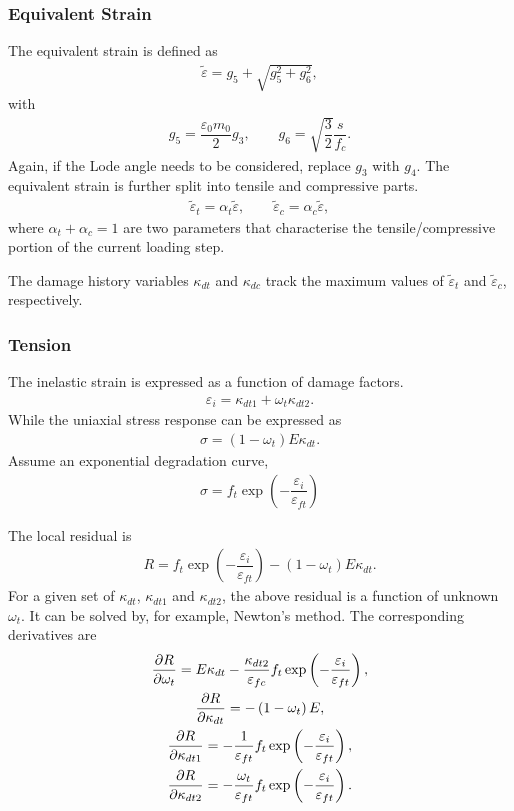 \subsubsection{Equivalent Strain}
The equivalent strain is defined as
\begin{gather}
\tilde{\varepsilon}=g_5+\sqrt{g_5^2+g_6^2},
\end{gather}
with
\begin{gather}
g_5=\dfrac{\varepsilon_0m_0}{2}g_3,\qquad
g_6=\sqrt{\dfrac{3}{2}}\dfrac{s}{f_c}.
\end{gather}
Again, if the Lode angle needs to be considered, replace $g_3$ with $g_4$. The equivalent strain is further split into tensile and compressive parts.
\begin{gather}
\tilde{\varepsilon}_t=\alpha_t\tilde{\varepsilon},\qquad
\tilde{\varepsilon}_c=\alpha_c\tilde{\varepsilon},
\end{gather}
where $\alpha_t+\alpha_c=1$ are two parameters that characterise the tensile/compressive portion of the current loading step.

The damage history variables $\kappa_{dt}$ and $\kappa_{dc}$ track the maximum values of $\tilde{\varepsilon}_t$ and $\tilde{\varepsilon}_c$, respectively.
\subsubsection{Tension}
The inelastic strain is expressed as a function of damage factors.
\begin{gather}
\varepsilon_i=\kappa_{dt1}+\omega_t\kappa_{dt2}.
\end{gather}
While the uniaxial stress response can be expressed as
\begin{gather}
\sigma=\left(1-\omega_t\right)E\kappa_{dt}.
\end{gather}
Assume an exponential degradation curve,
\begin{gather}
\sigma=f_t\exp\left(-\dfrac{\varepsilon_i}{\varepsilon_{ft}}\right)
\end{gather}

The local residual is
\begin{gather}
R=f_t\exp\left(-\dfrac{\varepsilon_i}{\varepsilon_{ft}}\right)-\left(1-\omega_t\right)E\kappa_{dt}.
\end{gather}
For a given set of $\kappa_{dt}$, $\kappa_{dt1}$ and $\kappa_{dt2}$, the above residual is a function of unknown $\omega_t$. It can be solved by, for example, Newton's method.
The corresponding derivatives are
\begin{gather}
\dfrac{\partial{R}}{\partial{\omega_t}}=E\kappa_{dt}-\dfrac{\kappa_{dt2}}{\varepsilon_{fc}}f_t\exp\left(-\dfrac{\varepsilon_i}{\varepsilon_{ft}}\right),\\
\dfrac{\partial{R}}{\partial{\kappa_{dt}}}=-\left(1-\omega_t\right)E,\\
\dfrac{\partial{R}}{\partial{\kappa_{dt1}}}=-\dfrac{1}{\varepsilon_{ft}}f_t\exp\left(-\dfrac{\varepsilon_i}{\varepsilon_{ft}}\right),\\
\dfrac{\partial{R}}{\partial{\kappa_{dt2}}}=-\dfrac{\omega_t}{\varepsilon_{ft}}f_t\exp\left(-\dfrac{\varepsilon_i}{\varepsilon_{ft}}\right).
\end{gather}
